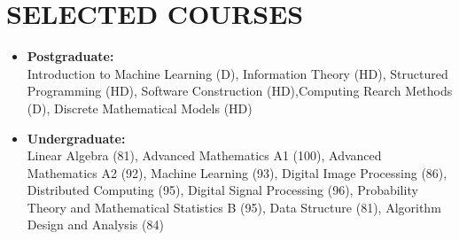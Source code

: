 \documentclass[11pt,a4paper,roman]{moderncv}        %
\begin{document}
	\section{SELECTED COURSES}
	
	\begin{itemize}
		\item \textbf{Postgraduate:} \vspace*{0.75mm} \\
		Introduction to Machine Learning (D), Information Theory (HD), Structured Programming (HD), Software Construction (HD),Computing Rearch Methods (D), Discrete Mathematical Models (HD)
		\vspace*{1.75mm}
		\item \textbf{Undergraduate:} \vspace*{0.75mm} \\
		Linear Algebra (81), Advanced Mathematics A1 (100), Advanced Mathematics A2 (92), Machine Learning (93), Digital Image Processing (86), Distributed Computing (95), Digital Signal Processing (96), Probability Theory and Mathematical Statistics B (95), Data Structure (81),  Algorithm Design and Analysis (84)
 	\end{itemize}
	


	

	\cfoot{\vspace{-2mm}{\color{gray} \rule[-10pt]{14.3cm}{0.05em}} \vspace{2mm}\\ \emph{\textcolor{gray}{Last Updated by: 2025/10/01}}}
	
	
\end{document}
